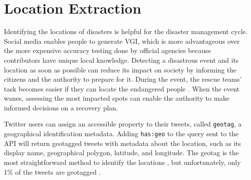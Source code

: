 \section{Location Extraction} 
Identifying the locations of disasters is helpful for the disaster
management cycle. Social media enables people to generate \ac{VGI}, which is more advantageous over
the more expensive accuracy testing done by official agencies because contributors have unique local
knowledge.  Detecting a disastrous event and its location as soon as possible can reduce its impact
on society \cite{debruijnGlobalDatabaseHistoric2019b} by informing the citizens and the authority to
prepare for it. During the event, the rescue teams' task becomes easier if they can locate the
endangered people \cite{singhEventClassificationLocation2019}. When the event wanes, assessing the
most impacted spots can enable the authority to make informed decisions on a recovery plan.

Twitter users can assign an accessible property to their tweets, called \texttt{geotag}, a geographical
identification metadata. Adding \texttt{has:geo} to the query sent to the \ac{API} will return geotagged
tweets with metadata about the location, such as its display name, geographical polygon,
latitude, and longitude. The geotag is the most straightforward method to identify the locations 
\cite{fengExtractionPluvialFlood2018}, but unfortunately, only 1\% of the tweets are geotagged
\cite{middletonLocationExtractionSocial2018}.

